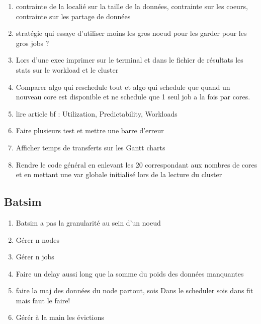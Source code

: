 \documentclass[a4paper]{article}
\begin{document}
\begin{enumerate}
			\item contrainte de la localié sur la taille de la données, contrainte sur les coeurs, contrainte sur les partage de données
			\item stratégie qui essaye d'utiliser moins les gros noeud pour les garder pour les gros jobs ?
			\item Lors d'une exec imprimer sur le terminal et dans le fichier de résultats les stats sur le workload et le cluster
			\item Comparer algo qui reschedule tout et algo qui schedule que quand un nouveau core est disponible et ne schedule que 1 seul job a la fois par cores.
			\item lire article bf : Utilization, Predictability, Workloads
			\item Faire plusieurs test et mettre une barre d'erreur
			\item Afficher temps de transferts sur les Gantt charts
			\item Rendre le code général en enlevant les 20 correspondant aux nombres de cores et en mettant une var globale initialisé lors de la lecture du cluster
		\end{enumerate}
	\subsection{Batsim}
		\begin{enumerate}
			\item Batsim a pas la granularité au sein d'un noeud
			\item Gérer n nodes
			\item Gérer n jobs
			\item Faire un delay aussi long que la somme du poids des données manquantes
			\item faire la maj des données du node partout, sois Dans le scheduler sois dans fit mais faut le faire!
			\item Gérér à la main les évictions
		\end{enumerate}
\end{document}
